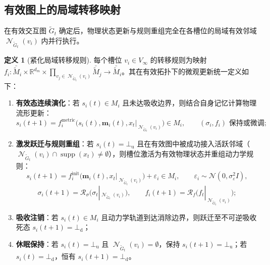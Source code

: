 \documentclass[11pt,a4paper]{article}
\numberwithin{equation}{section}
\theoremstyle{definition}
\newtheorem{definition}{定义}[section]
\theoremstyle{remark}
\DeclareMathOperator{\Ncal}{\mathcal{N}}   %
\DeclareMathOperator{\supp}{\mathrm{supp}} %
\begin{document}
	\subsection{有效图上的局域转移映射}
	
	在有效交互图 $\widetilde{G}_t$ 确定后，物理状态更新与规则重组完全在各槽位的局域有效邻域 $\Ncal_{\widetilde{G}_t}(v_i)$ 内并行执行。
	
	\begin{definition}[紧化局域转移规则]\label{def:compact-f}
		每个槽位 $v_i\in V_\infty$ 的转移规则为映射 $f_i: \bar{\widetilde{M}}_i \times \mathbb{R}^{d_m} \times \prod_{v_j\in\Ncal_{\widetilde{G}_t}(v_i)}\bar{\widetilde{M}}_j \to \bar{\widetilde{M}}_i$。其在有效拓扑下的微观更新统一定义如下：
		\begin{enumerate}[label=(\arabic*), leftmargin=2.4em]
			\item \textbf{有效态连续演化}：若 $s_i(t)\in M_i$ 且未达吸收边界，则结合自身记忆计算物理流形更新：
			\[
			s_i(t+1) = f^{\text{metric}}_i\bigl(s_i(t), \mathbf{m}_i(t), x_t|_{\Ncal_{\widetilde{G}_t}(v_i)}\bigr) \in M_i, \qquad (\sigma_i, f_i) \text{ 保持或微调};
			\]
			\item \textbf{激发跃迁与规则重组}：若 $s_i(t)=\bot_{\mathrm{u}}$ 且在有效图中被成功接入活跃邻域（$\Ncal_{\widetilde{G}_t}(v_i)\cap\supp(x_t)\neq\emptyset$），则槽位激活为有效物理状态并重组动力学规则：
			\begin{equation}
				s_i(t+1) = f^{\text{init}}_i\bigl(\mathbf{m}_i(t), x_t|_{\Ncal_{\widetilde{G}_t}(v_i)}\bigr) + \varepsilon_i \in M_i, \qquad \varepsilon_i \sim \mathcal{N}(0, \sigma_\varepsilon^2 I),
				\label{eq:f-active}
			\end{equation}
			\begin{equation}
				\sigma_i(t+1) = \mathcal{R}_\sigma\bigl(\sigma_t|_{\Ncal_{\widetilde{G}_t}(v_i)}\bigr), \qquad
				f_i(t+1) = \mathcal{R}_f\bigl(f_t|_{\Ncal_{\widetilde{G}_t}(v_i)}\bigr);
				\label{eq:r-assign}
			\end{equation}
			\item \textbf{吸收注销}：若 $s_i(t)\in M_i$ 且动力学轨道到达消除边界，则跃迁至不可逆吸收死态 $s_i(t+1) = \bot_{\mathrm{d}}$；
			\item \textbf{休眠保持}：若 $s_i(t)=\bot_{\mathrm{u}}$ 且 $\Ncal_{\widetilde{G}_t}(v_i)=\emptyset$，保持 $s_i(t+1)=\bot_{\mathrm{u}}$；若 $s_i(t)=\bot_{\mathrm{d}}$，恒有 $s_i(t+1)=\bot_{\mathrm{d}}$。
		\end{enumerate}
	\end{definition}
	
\end{document}
